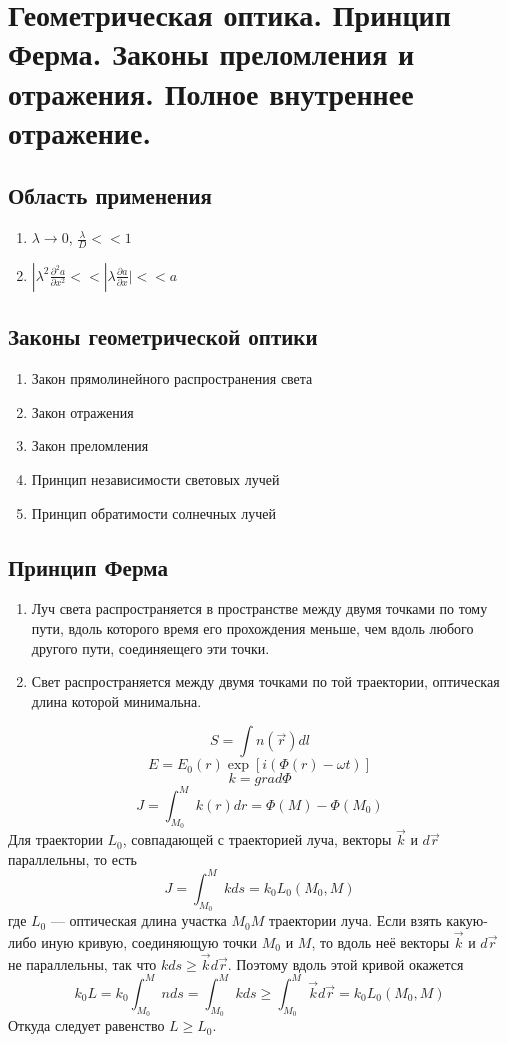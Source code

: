 \section{Геометрическая оптика. Принцип Ферма. Законы преломления и отражения. Полное внутреннее отражение.}
\subsection*{Область применения}
\begin{enumerate}
	\item $\lambda \rightarrow 0$, $\frac{\lambda}{D} << 1$
	\item $|\lambda^2 \frac{\partial^2 a}{\partial x^2} << |\lambda \frac{\partial a}{\partial x}| << a$
\end{enumerate}
\subsection*{Законы геометрической оптики}
\begin{enumerate}
	\item Закон прямолинейного распространения света
	\item Закон отражения
	\item Закон преломления
	\item Принцип независимости световых лучей 
	\item Принцип обратимости солнечных лучей
\end{enumerate}
\subsection*{Принцип Ферма}
\begin{enumerate}
	\item Луч света распространяется в пространстве между двумя точками по тому пути, вдоль которого время его прохождения меньше, чем вдоль любого другого пути, соединяещего эти точки.
	\item Свет распространяется между двумя точками по той траектории, оптическая длина которой минимальна.
\end{enumerate}
$$S = \int n(\vec{r}) d l$$
$$E = E_0(r) \exp [i(\Phi(r) - \omega t)]$$
$$k = grad \Phi$$
$$J = \int_{M_0}^{M} k(r)dr = \Phi(M) - \Phi(M_0)$$
Для траектории $L_0$, совпадающей с траекторией луча, векторы $\vec{k}$ и $d\vec{r}$ параллельны, то есть 
$$J = \int_{M_0}^{M} kds = k_0 L_0 (M_0,M)$$
где $L_0$ --- оптическая длина участка $M_0 M$ траектории луча. Если взять какую-либо иную кривую, соединяющую точки $M_0$ и $M$, то вдоль неё векторы $\vec{k}$ и $d\vec{r}$ не параллельны, так что $kds\geq \vec{k}d\vec{r}$. Поэтому вдоль этой кривой окажется 
$$k_0L = k_0 \int_{M_0}^{M} nds = \int_{M_0}^{M} kds \geq \int_{M_0}^{M} \vec{k}d\vec{r} = k_0 L_0 (M_0, M)$$
Откуда следует равенство $L \geq L_0$.
